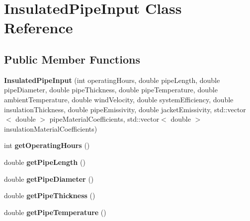 \hypertarget{class_insulated_pipe_input}{}\section{Insulated\+Pipe\+Input Class Reference}
\label{class_insulated_pipe_input}
\subsection*{Public Member Functions}
\begin{DoxyCompactItemize}
\item 
\mbox{\label{class_insulated_pipe_input_a468ececc5c5a120b4e4a008bb9491966}} 
{\bfseries Insulated\+Pipe\+Input} (int operating\+Hours, double pipe\+Length, double pipe\+Diameter, double pipe\+Thickness, double pipe\+Temperature, double ambient\+Temperature, double wind\+Velocity, double system\+Efficiency, double insulation\+Thickness, double pipe\+Emissivity, double jacket\+Emissivity, std\+::vector$<$ double $>$ pipe\+Material\+Coefficients, std\+::vector$<$ double $>$ insulation\+Material\+Coefficients)
\item 
\mbox{\label{class_insulated_pipe_input_a001e1d1dbab85f87e08e05c192bb92e6}} 
int {\bfseries get\+Operating\+Hours} ()
\item 
\mbox{\label{class_insulated_pipe_input_adb11559587bf7f74a2b46c16ab80bbf1}} 
double {\bfseries get\+Pipe\+Length} ()
\item 
\mbox{\label{class_insulated_pipe_input_af8f76905b5a0f9dcd65c098f7fd1fa8f}} 
double {\bfseries get\+Pipe\+Diameter} ()
\item 
\mbox{\label{class_insulated_pipe_input_a4bf5fd5828533ae03eb3f2b1697c84f9}} 
double {\bfseries get\+Pipe\+Thickness} ()
\item 
\mbox{\label{class_insulated_pipe_input_a3ea79c3e73cddca6361893f98f3c5b91}} 
double {\bfseries get\+Pipe\+Temperature} ()
\item 
\mbox{\label{class_insulated_pipe_input_a2a1618b06bdbfe6bf3b3f5ae57e074dd}} 

\end{DoxyCompactItemize}

